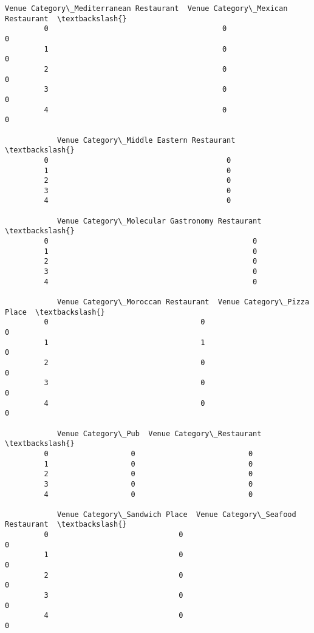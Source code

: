 \documentclass[11pt]{article}
\begin{document}
\begin{Verbatim}[commandchars=\\\{\}]
            Venue Category\_Mediterranean Restaurant  Venue Category\_Mexican Restaurant  \textbackslash{}
         0                                        0                                  0   
         1                                        0                                  0   
         2                                        0                                  0   
         3                                        0                                  0   
         4                                        0                                  0   
         
            Venue Category\_Middle Eastern Restaurant  \textbackslash{}
         0                                         0   
         1                                         0   
         2                                         0   
         3                                         0   
         4                                         0   
         
            Venue Category\_Molecular Gastronomy Restaurant  \textbackslash{}
         0                                               0   
         1                                               0   
         2                                               0   
         3                                               0   
         4                                               0   
         
            Venue Category\_Moroccan Restaurant  Venue Category\_Pizza Place  \textbackslash{}
         0                                   0                           0   
         1                                   1                           0   
         2                                   0                           0   
         3                                   0                           0   
         4                                   0                           0   
         
            Venue Category\_Pub  Venue Category\_Restaurant  \textbackslash{}
         0                   0                          0   
         1                   0                          0   
         2                   0                          0   
         3                   0                          0   
         4                   0                          0   
         
            Venue Category\_Sandwich Place  Venue Category\_Seafood Restaurant  \textbackslash{}
         0                              0                                  0   
         1                              0                                  0   
         2                              0                                  0   
         3                              0                                  0   
         4                              0                                  0   
         

\end{Verbatim}
\end{document}
